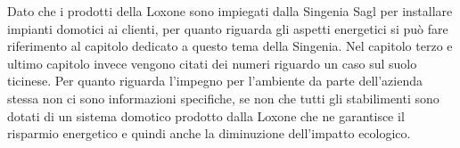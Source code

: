 Dato che i prodotti della Loxone sono impiegati dalla Singenia Sagl per installare impianti domotici ai clienti, per quanto riguarda gli aspetti energetici si può fare riferimento al capitolo dedicato a questo tema della Singenia.  Nel capitolo terzo e ultimo capitolo invece vengono citati dei numeri riguardo un caso sul suolo ticinese. Per quanto riguarda l’impegno per l’ambiente da parte dell’azienda stessa non ci sono informazioni specifiche, se non che tutti gli stabilimenti sono dotati di un sistema domotico prodotto dalla Loxone che ne garantisce il risparmio energetico e quindi anche la diminuzione dell’impatto ecologico.